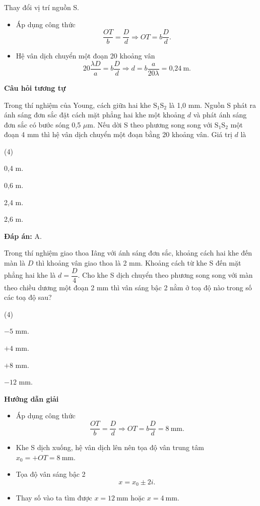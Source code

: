 \begin{dang}{Thay đổi vị trí nguồn S.}
{\begin{itemize}
	\item  Áp dụng công thức
	\begin{equation*}
		\dfrac{OT}{b}=\dfrac{D}{d} \Rightarrow OT=b\dfrac{D}{d}.
	\end{equation*}
	\item Hệ vân dịch chuyển một đoạn 20 khoảng vân
	\begin{equation*}
		20 \dfrac{\lambda D}{a}=b\dfrac{D}{d}\Rightarrow d=b\dfrac{a}{20\lambda}=\text{0,24}\ \text{m}.
	\end{equation*}
 \end{itemize}
 \begin{center}
	\textbf{Câu hỏi tương tự}
\end{center}

Trong thí nghiệm của Young, cách giữa hai khe $\text{S}_1\text{S}_2$ là 1,0 mm. Nguồn S phát ra ánh sáng đơn sắc đặt cách mặt phẳng hai khe một khoảng $d$ và phát ánh sáng đơn sắc có bước sóng 0,5 $\mu$m. Nếu dời S theo phương song song với $\text{S}_1\text{S}_2$ một đoạn 4 mm thì hệ vân dịch chuyển một đoạn bằng 20 khoảng vân. Giá trị $d$ là 
\begin{mcq}(4)
\item 0,4 m.			
\item 0,6 m.			
\item 2,4 m.			
\item 2,6 m.
\end{mcq}

\textbf{Đáp án:} A.
}

{Trong thí nghiệm giao thoa Iâng với ánh sáng đơn sắc, khoảng cách hai khe đến màn là $D$ thì khoảng vân giao thoa là 2 mm. Khoảng cách từ khe S đến mặt phẳng hai khe là $d = \dfrac{D}{4}$. Cho khe S dịch chuyển theo phương song song với màn theo chiều dương một đoạn 2 mm thì vân sáng bậc 2 nằm ở toạ độ nào trong số các toạ độ sau?
\begin{mcq}(4)
\item $- 5$ mm.			
\item $+ 4$ mm.			
\item $+ 8$ mm.			
\item $- 12$ mm.
\end{mcq}
}
{\begin{center}
	\textbf{Hướng dẫn giải}
\end{center}

\begin{itemize}
	\item Áp dụng công thức
	\begin{equation*}
		\dfrac{OT}{b}=\dfrac{D}{d} \Rightarrow OT = b \dfrac{D}{d}=8\ \text{mm}.
	\end{equation*}
	\item Khe S dịch xuống, hệ vân dịch lên nên tọa độ vân trung tâm $x_0= + OT = 8\ \text{mm}$.
	\item Tọa độ vân sáng bậc 2
	\begin{equation*}
		x=x_0 \pm 2i.
	\end{equation*}
	\item Thay số vào ta tìm được $x = 12\ \text{mm}$ hoặc $x=4\ \text{mm}$.
\end{itemize}

}
\end{dang}
